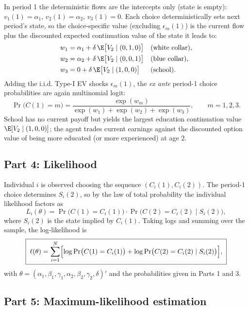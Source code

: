 \documentclass[11pt,english]{article}
\begin{document}
In period 1 the deterministic flows are the intercepts only (state is empty):
$v_1(1)=\alpha_1$, $v_2(1)=\alpha_2$, $v_3(1)=0$. Each choice deterministically
sets next period's state, so the choice-specific value (excluding $\epsilon_m(1)$)
is the current flow plus the discounted expected continuation value of the state
it leads to:
\begin{align}
w_{1}&=\alpha_{1}+\delta\,\E\bigl[V_2\mid(0,1,0)\bigr] && \text{(white collar)},\\
w_{2}&=\alpha_{2}+\delta\,\E\bigl[V_2\mid(0,0,1)\bigr] && \text{(blue collar)},\\
w_{3}&=0+\delta\,\E\bigl[V_2\mid(1,0,0)\bigr] && \text{(school)}.
\end{align}
Adding the i.i.d. Type-I EV shocks $\epsilon_m(1)$, the \emph{ex ante} period-1
choice probabilities are again multinomial logit:
\begin{equation}
\Pr\bigl(C(1)=m\bigr)=\frac{\exp(w_{m})}{\exp(w_{1})+\exp(w_{2})+\exp(w_{3})},
\qquad m=1,2,3 .
\end{equation}
School has no current payoff but yields the largest education continuation value
$\E[V_2\mid(1,0,0)]$; the agent trades current earnings against the discounted
option value of being more educated (or more experienced) at age 2.

\subsection*{Part 4: Likelihood}

Individual $i$ is observed choosing the sequence $(C_i(1),C_i(2))$. The
period-1 choice determines $S_i(2)$, so by the law of total probability the
individual likelihood factors as
\begin{equation}
L_i(\theta)=\Pr\bigl(C(1)=C_i(1)\bigr)\cdot
\Pr\bigl(C(2)=C_i(2)\mid S_i(2)\bigr),
\end{equation}
where $S_i(2)$ is the state implied by $C_i(1)$. Taking logs and summing over the
sample, the log-likelihood is
\begin{equation}\boxed{\;
\ell(\theta)=\sum_{i=1}^{N}\Bigl[\log\Pr\bigl(C(1)=C_i(1)\bigr)
+\log\Pr\bigl(C(2)=C_i(2)\mid S_i(2)\bigr)\Bigr],
\;}\end{equation}
with $\theta=(\alpha_1,\beta_1,\gamma_1,\alpha_2,\beta_2,\gamma_2,\delta)'$ and
the probabilities given in Parts 1 and 3.

\subsection*{Part 5: Maximum-likelihood estimation}
\end{document}
